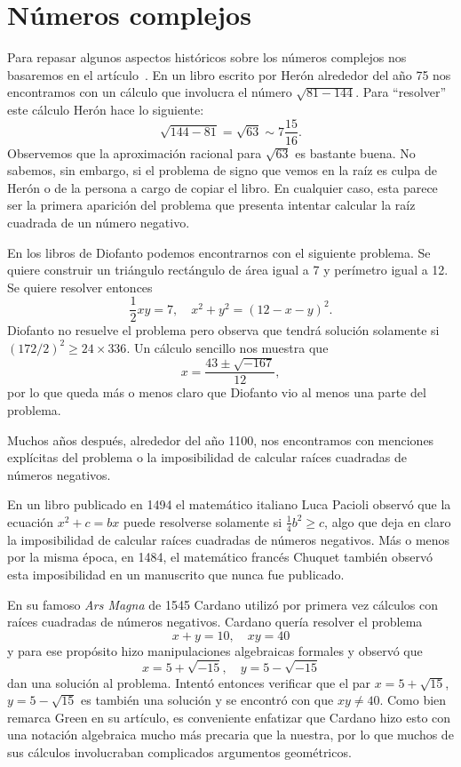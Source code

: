 \chapter{Números complejos}


Para repasar algunos aspectos históricos sobre los números complejos nos
basaremos en el artículo~\cite{MR490654}. 
En un libro escrito por Herón alrededor del año 75 nos encontramos con un
cálculo que involucra el número $\sqrt{81-144}$. Para ``resolver'' este cálculo
Herón hace lo siguiente:
\[
	\sqrt{144-81}=\sqrt{63}\sim 7\frac{15}{16}.
\]
Observemos que la aproximación racional para $\sqrt{63}$ es bastante buena. No
sabemos, sin embargo, si el problema de signo que vemos en la raíz es culpa de
Herón o de la persona a cargo de copiar el libro. En cualquier caso, esta
parece ser la primera aparición del problema que presenta intentar calcular la
raíz cuadrada de un número negativo.

En los libros de Diofanto podemos encontrarnos con el siguiente problema. Se
quiere construir un triángulo rectángulo de área igual a 7 y perímetro igual a
12. Se quiere resolver entonces 
\[
	\frac12 xy=7,\quad
	x^2+y^2=(12-x-y)^2.
\]
Diofanto no resuelve el problema pero observa que tendrá solución solamente si
$(172/2)^2\geq 24\times 336$.  Un cálculo sencillo nos muestra que
\[
	x=\frac{43\pm\sqrt{-167}}{12},
\]
por lo que queda más o menos claro que Diofanto vio al menos una parte del
problema. 

Muchos años después, alrededor del año 1100, nos encontramos con menciones
explícitas del problema o la imposibilidad de calcular raíces cuadradas de
números negativos. 

En un libro publicado en 1494 el matemático italiano Luca Pacioli observó que
la ecuación $x^2+c=bx$ puede resolverse solamente si $\frac14b^2\geq c$, algo
que deja en claro la imposibilidad de calcular raíces cuadradas de números
negativos. Más o menos por la misma época, en 1484, el matemático francés
Chuquet también observó esta imposibilidad en un manuscrito que nunca fue
publicado.

En su famoso \emph{Ars Magna} de 1545 Cardano utilizó por primera vez cálculos
con raíces cuadradas de números negativos. Cardano quería resolver el problema
\[
	x+y=10,\quad
	xy=40
\]
y para ese propósito hizo manipulaciones algebraicas formales y observó que
\[
	x=5+\sqrt{-15},\quad
	y=5-\sqrt{-15}
\]
dan una solución al problema. Intentó entonces verificar que el par
$x=5+\sqrt{15}$, $y=5-\sqrt{15}$ es también una solución y se encontró con que
$xy\ne 40$. Como bien remarca Green en su artículo, es conveniente enfatizar
que Cardano hizo esto con una notación algebraica mucho más precaria que la
nuestra, por lo que muchos de sus cálculos involucraban complicados argumentos
geométricos. 

